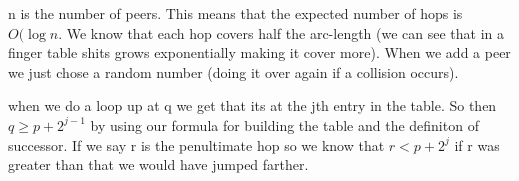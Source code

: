 \documentclass[12pt]{article}
\begin{document}

n is the number of peers. This means that the expected number of hops is $O(\log n$. We know that each hop covers half the arc-length (we can see that in a finger table shits grows exponentially making it cover more). When we add a peer we just chose a random number (doing it over again if a collision occurs). 


when we do a loop up  at q we get that its at the jth entry in the table. So then $q \ge p + 2^{j-1}$ by using our formula for building the table and the definiton of successor. If we say r is the penultimate hop so we know that $r < p + 2^j$ if r was greater than that we would have jumped farther. 
\end{document}
